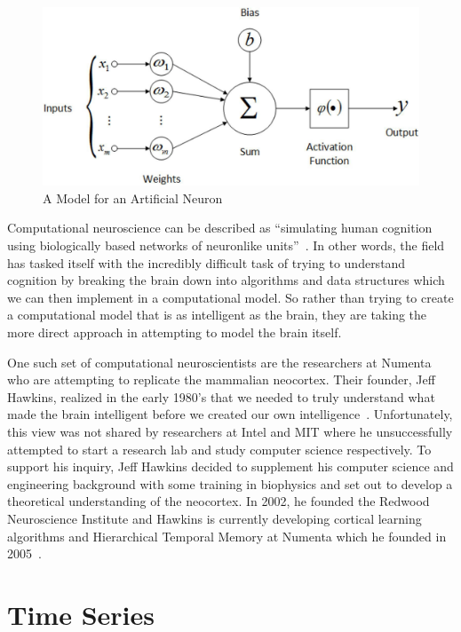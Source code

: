 \documentclass[oneside,12pt,openany]{book}
\begin{document}
	\begin{figure}[hbt!]
		\centering
		\includegraphics[width=.8\linewidth]{images/ArtificialNeuron.jpg}
		\caption[A Model for an Artificial Neuron]{A Model for an Artificial Neuron\footnotemark}
		\label{fig:ArtNeuron}
	\end{figure}
	
	Computational neuroscience can be described as ``simulating human cognition using biologically based networks of neuronlike units''~\cite{Eberhart}. In other words, the field has tasked itself with the incredibly difficult task of trying to understand cognition by breaking the brain down into algorithms and data structures which we can then implement in a computational model. So rather than trying to create a computational model that is as intelligent as the brain, they are taking the more direct approach in attempting to model the brain itself.
	
	One such set of computational neuroscientists are the researchers at Numenta who are attempting to replicate the mammalian neocortex. Their founder, Jeff Hawkins, realized in the early 1980's that we needed to truly understand what made the brain intelligent before we created our own intelligence~\cite{OnIntelligence}. Unfortunately, this view was not shared by  researchers at Intel and MIT where he unsuccessfully attempted to start a research lab and study computer science respectively. To support his inquiry, Jeff Hawkins decided to supplement his computer science and engineering background with some training in biophysics and set out to develop a theoretical understanding of the neocortex. In 2002, he founded the Redwood Neuroscience Institute and Hawkins is currently developing cortical learning algorithms and Hierarchical Temporal Memory at Numenta which he founded in 2005~\cite{OnIntelligence}. 
	
	\chapter{Time Series}
	
\end{document}
